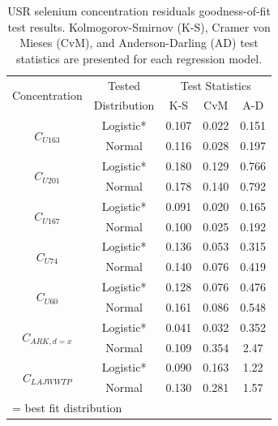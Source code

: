 \begin{table}[htbp]
  \centering
  \caption[USR selenium concentration residuals goodness-of-fit test results.]{USR selenium concentration residuals goodness-of-fit test results.  Kolmogorov-Smirnov (K-S), Cramer von Mieses (CvM), and Anderson-Darling (AD) test statistics are presented for each regression model.}
    \begin{tabular}{ccccc}
    \toprule
    \multirow{2}{*}{Concentration}&Tested & \multicolumn{3}{c}{Test Statistics} \\ \cmidrule(r{.5em}l){3-5}
    &Distribution  & K-S   & CvM   & A-D \\
    \toprule
    \multirow{2}{*}{$ C_{U163} $}			&Logistic*	&0.107	&0.022	&0.151 \\
    								&Normal		&0.116	&0.028	&0.197 \\
    \midrule
    \multirow{2}{*}{$ C_{U201} $}			&Logistic*	&0.180	&0.129	&0.766	\\
    								&Normal		&0.178	&0.140	&0.792	\\
    \midrule
    \multirow{2}{*}{$ C_{U167} $}		&Logistic*	&0.091	&0.020	&0.165	\\
    								&Normal		&0.100	&0.025	&0.192	\\
    \midrule
    \multirow{2}{*}{$ C_{U74} $}		&Logistic*	&0.136	&0.053	&0.315	\\
    								&Normal		&0.140	&0.076	&0.419	\\
    \midrule
    \multirow{2}{*}{$ C_{U60} $}		&Logistic*	&0.128	&0.076	&0.476	\\
    								&Normal		&0.161	&0.086	&0.548	\\
    \midrule
    \multirow{2}{*}{$ C_{ARK,d=x} $}		&Logistic*	&0.041	&0.032	&0.352	\\
    								&Normal		&0.109	&0.354	&2.47	\\
    \midrule
    \multirow{2}{*}{$ C_{LAJWWTP} $}	&Logistic*	&0.090	&0.163	&1.22	\\
    								&Normal		&0.130	&0.281	&1.57	\\
    \bottomrule
    \multicolumn{5}{l}{\footnotesize * = best fit distribution}\\
    \end{tabular}%
  \label{tab:USRGoF}%
\end{table}%

